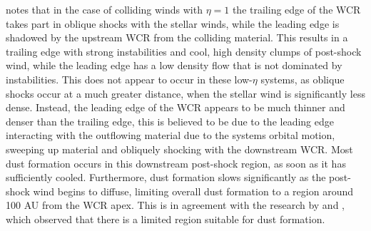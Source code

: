 \textcite{pittard_3d_2009} notes that in the case of colliding winds with $\eta = 1$ the trailing edge of the WCR takes part in oblique shocks with the stellar winds, while the leading edge is shadowed by the upstream WCR from the colliding material.
This results in a trailing edge with strong instabilities and cool, high density clumps of post-shock wind, while the leading edge has a low density flow that is not dominated by instabilities.
This does not appear to occur in these low-$\eta$ systems, as oblique shocks occur at a much greater distance, when the stellar wind is significantly less dense.
Instead, the leading edge of the WCR appears to be much thinner and denser than the trailing edge, this is believed to be due to the leading edge interacting with the outflowing material due to the systems orbital motion, sweeping up material and obliquely shocking with the downstream WCR. %
Most dust formation occurs in this downstream post-shock region, as soon as it has sufficiently cooled.
Furthermore, dust formation slows significantly as the post-shock wind begins to diffuse, limiting overall dust formation to a region around 100 AU from the WCR apex. %
This is in agreement with the research by \textcite{williams_dust_1990} and \textcite{hendrix_pinwheels_2016}, which observed that there is a limited region suitable for dust formation.

